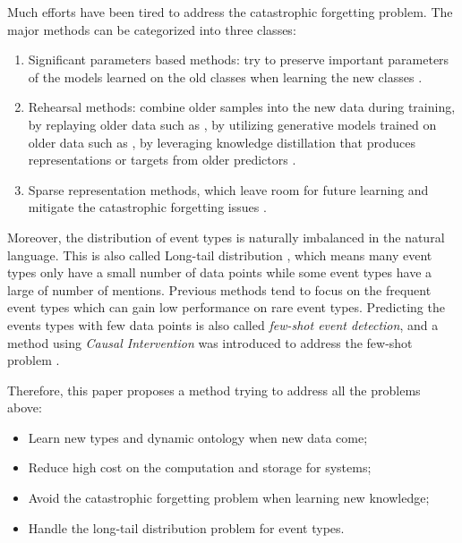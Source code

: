 Much efforts have been tired to address the catastrophic forgetting problem. The major methods can be categorized into three classes: 
\begin{enumerate}[noitemsep]
  \item Significant parameters based methods: try to preserve important parameters of the models learned on the old classes when learning the new classes \citep{kirkpatrick2017overcoming, aljundi2018memory}.
  \item Rehearsal methods: combine older samples into the new data during training, by replaying older data such as \citet{rebuffi2017icarl, hou2019learning}, by utilizing generative models trained on older data such as \citet{shin2017continual}, by leveraging knowledge distillation that produces representations or targets from older predictors \citep{li2017learning, cao2020incremental}.
  \item Sparse representation methods, which leave room for future learning and mitigate the catastrophic forgetting issues \citep{liu2019utility, aljundi2018selfless}.
\end{enumerate}

Moreover, the distribution of event types is naturally imbalanced in the natural language. This is also called Long-tail distribution \citep{yu2021lifelong}, which means many event types only have a small number of data points while some event types have a large of number of mentions. Previous methods \citep{nguyen2016two, cao2020incremental} tend to focus on the frequent event types which can gain low performance on rare event types. Predicting the events types with few data points is also called \textit{few-shot event detection}, and a method using \textit{Causal Intervention} was introduced to address the few-shot problem \citep{chen2021honey}.

Therefore, this paper proposes a method trying to address all the problems above:
\begin{itemize}[noitemsep]
  \item Learn new types and dynamic ontology when new data come;
  \item Reduce high cost on the computation and storage for systems;
  \item Avoid the catastrophic forgetting problem when learning new knowledge;
  \item Handle the long-tail distribution problem for event types.
\end{itemize}

